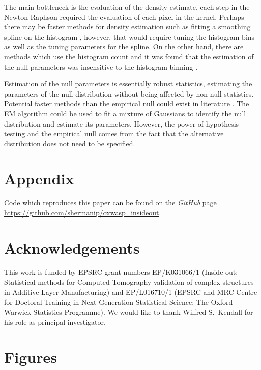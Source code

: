 \documentclass{article}
\renewcommand{\listoffigures}{\begingroup
\tocsection
\tocfile{\listfigurename}{lof}
\endgroup}
\begin{document}
The main bottleneck is the evaluation of the density estimate, each step in the Newton-Raphson required the evaluation of each pixel in the kernel. Perhaps there may be faster methods for density estimation such as fitting a smoothing spline on the histogram \citep{efron2004large}, however, that would require tuning the histogram bins as well as the tuning parameters for the spline. On the other hand, there are methods which use the histogram count and it was found that the estimation of the null parameters was insensitive to the histogram binning \citep{schwartzman2008empirical}.

Estimation of the null parameters is essentially robust statistics, estimating the parameters of the null distribution without being affected by non-null statistics. Potential faster methods than the empirical null could exist in literature \citep{hampel1986robust, huber2009robust, jewson2018principles, maronna2006robust, rousseeuw1987robust}. The EM algorithm \citep{bishop2006pattern, dempster1977maximum} could be used to fit a mixture of Gaussians to identify the null distribution and estimate its parameters. However, the power of hypothesis testing and the empirical null comes from the fact that the alternative distribution does not need to be specified.

\section{Appendix}
Code which reproduces this paper can be found on the \emph{GitHub} page \url{https://github.com/shermanip/oxwasp_insideout}.

\section{Acknowledgements}
This work is funded by EPSRC grant numbers EP/K031066/1 (Inside-out: Statistical methods for Computed Tomography validation of complex structures in Additive Layer Manufacturing) and EP/L016710/1 (EPSRC and MRC Centre for Doctoral Training in Next Generation Statistical Science: The Oxford-Warwick Statistics Programme). We would like to thank Wilfred S.~Kendall for his role as principal investigator.




\listoffigures
\clearpage
\section{Figures}
\end{document}
